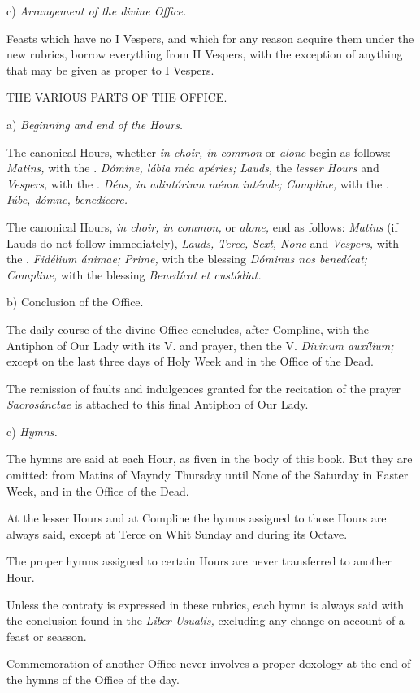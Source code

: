 c) {\it Arrangement of the divine Office.}

Feasts which have no I Vespers, and which for any reason acquire them under the new rubrics, borrow everything from II Vespers, with the exception of anything that may be given as proper to I Vespers.

THE VARIOUS PARTS OF THE OFFICE.

a) {\it Beginning and end of the Hours.}

The canonical Hours, whether {\it in choir, in common} or {\it alone} begin as follows:
{\it Matins,} with the \Vbar. {\it Dómine, lábia méa apéries;}
{\it Lauds,} the {\it lesser Hours} and {\it Vespers,} with the \Vbar. {\it Déus, in adiutórium méum inténde;}
{\it Compline,} with the \Vbar. {\it Iúbe, dómne, benedícere.}

The canonical Hours, {\it in choir, in common,} or {\it alone,} end as follows:
{\it Matins} (if Lauds do not follow immediately), {\it Lauds, Terce, Sext, None} and {\it Vespers,} with the \Vbar. {\it Fidélium ánimae;}
{\it Prime,} with the blessing {\it Dóminus nos benedícat;}
{\it Compline,} with the blessing {\it Benedícat et custódiat.}

b) Conclusion of the Office.

The daily course of the divine Office concludes, after Compline, with the Antiphon of Our Lady with its V. and prayer, then the V. {\it Divinum auxílium;} except on the last three days of Holy Week and in the Office of the Dead.

The remission of faults and indulgences granted for the recitation of the prayer {\it Sacrosánctae} is attached to this final Antiphon of Our Lady.

c) {\it Hymns.}

The hymns are said at each Hour, as fiven in the body of this book. But they are omitted: from Matins of Mayndy Thursday until None of the Saturday in Easter Week, and in the Office of the Dead.

At the lesser Hours and at Compline the hymns assigned to those Hours are always said, except at Terce on Whit Sunday and during its Octave.

The proper hymns assigned to certain Hours are never transferred to another Hour.

Unless the contraty is expressed in these rubrics, each hymn is always said with the conclusion found in the {\it Liber Usualis,} excluding any change on account of a feast or seasson.

Commemoration of another Office never involves a proper doxology at the end of the hymns of the Office of the day.

